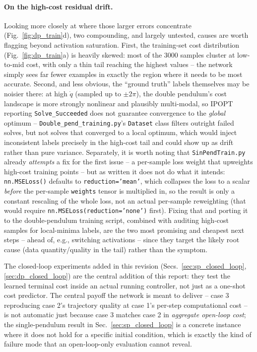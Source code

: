 \documentclass[11pt,a4paper]{article}
\begin{document}
\paragraph{On the high-cost residual drift.} Looking more closely at where those larger errors
concentrate (Fig.~\ref{fig:dp_train}d), two compounding, and largely untested, causes are worth
flagging beyond activation saturation. First, the training-set cost distribution
(Fig.~\ref{fig:dp_train}a) is heavily skewed: most of the 3000 samples cluster at low-to-mid cost,
with only a thin tail reaching the highest values -- the network simply sees far fewer examples in
exactly the region where it needs to be most accurate. Second, and less obvious, the ``ground
truth'' labels themselves may be noisier there: at high $\dot q$ (sampled up to $\pm 2\pi$), the
double pendulum's cost landscape is more strongly nonlinear and plausibly multi-modal, so IPOPT
reporting \texttt{Solve\_Succeeded} does not guarantee convergence to the \emph{global} optimum --
\texttt{Double\_pend\_training.py}'s \texttt{Dataset} class filters outright failed solves, but not
solves that converged to a local optimum, which would inject inconsistent labels precisely in the
high-cost tail and could show up as drift rather than pure variance. Separately, it is worth noting
that \texttt{SinPendTrain.py} already \emph{attempts} a fix for the first issue -- a per-sample
loss weight that upweights high-cost training points -- but as written it does not do what it
intends: \texttt{nn.MSELoss()} defaults to \texttt{reduction='mean'}, which collapses the loss to a
scalar \emph{before} the per-sample \texttt{weights} tensor is multiplied in, so the result is only
a constant rescaling of the whole loss, not an actual per-sample reweighting (that would require
\texttt{nn.MSELoss(reduction='none')} first). Fixing that and porting it to the double-pendulum
training script, combined with auditing high-cost samples for local-minima labels, are the two
most promising and cheapest next steps -- ahead of, e.g., switching activations -- since they
target the likely root cause (data quantity/quality in the tail) rather than the symptom.

The closed-loop experiments added in this revision (Secs.~\ref{sec:sp_closed_loop},
\ref{sec:dp_closed_loop}) are the central addition of this report: they test the learned
terminal cost inside an actual running controller, not just as a one-shot cost predictor. The
central payoff the network is meant to deliver -- case 3 reproducing case 2's trajectory quality
at case 1's per-step computational cost -- is not automatic just because case 3 matches case 2 in
\emph{aggregate open-loop cost}; the single-pendulum result in Sec.~\ref{sec:sp_closed_loop} is a
concrete instance where it does not hold for a specific initial condition, which is exactly the
kind of failure mode that an open-loop-only evaluation cannot reveal.
\end{document}
